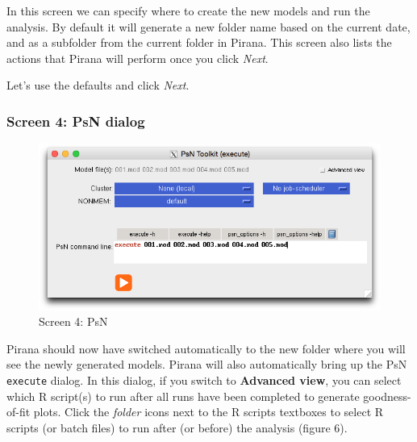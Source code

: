 In this screen we can specify where to create the new models and run the
analysis. By default it will generate a new folder name based on the
current date, and as a subfolder from the current folder in Pirana. This
screen also lists the actions that Pirana will perform once you click
\emph{Next}.

Let's use the defaults and click \emph{Next}.


\subsubsection*{Screen 4: PsN dialog}\label{screen-4-psn-dialog}

\begin{figure}[htbp]
\centering
\includegraphics[scale=0.5]{images/psn_simple.png}
\caption{Screen 4: PsN}
\end{figure}

Pirana should now have switched automatically to the new folder where
you will see the newly generated models. Pirana will also automatically
bring up the PsN \texttt{execute} dialog. In this dialog, if you switch
to \textbf{Advanced view}, you can select which R script(s) to run after
all runs have been completed to generate goodness-of-fit plots. Click
the \emph{folder} icons next to the R scripts textboxes to select R
scripts (or batch files) to run after (or before) the analysis (figure
6).

